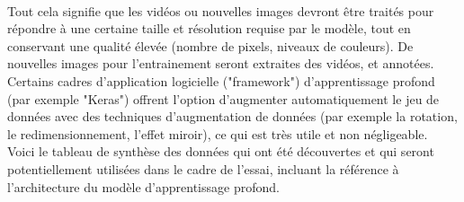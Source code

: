 \vspace{\baselineskip}
\\
\noindent Tout cela signifie que les vidéos ou nouvelles images devront être traités pour répondre à une certaine taille et résolution requise par le modèle, tout en conservant une qualité élevée (nombre de pixels, niveaux de couleurs). De nouvelles images pour l'entrainement seront extraites des vidéos, et annotées. 
\vspace{\baselineskip}
\\
\noindent Certains cadres d'application logicielle ("framework") d'apprentissage profond (par exemple "Keras") offrent l'option d'augmenter automatiquement le jeu de données avec des techniques d'augmentation de données (par exemple la rotation, le redimensionnement, l'effet miroir), ce qui est très utile et non négligeable.
\vspace{\baselineskip}
\\
\noindent Voici le tableau de synthèse des données qui ont été découvertes et qui seront potentiellement utilisées dans le cadre de l'essai, incluant la référence à l'architecture du modèle d'apprentissage profond.
